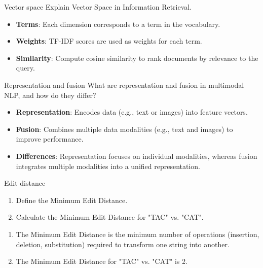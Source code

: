 \documentclass{article}
\begin{document}
\begin{exercise}{Vector space}
  Explain Vector Space in Information Retrieval.

  \begin{solution}
    \begin{itemize}
        \item \textbf{Terms}: Each dimension corresponds to a term in the vocabulary.
        \item \textbf{Weights}: TF-IDF scores are used as weights for each term.
        \item \textbf{Similarity}: Compute cosine similarity to rank documents by relevance to the query.
    \end{itemize}
  \end{solution}
\end{exercise}

\begin{exercise}{Representation and fusion}
  What are representation and fusion in multimodal NLP, and how do they differ?

  \begin{solution}
    \begin{itemize}
        \item \textbf{Representation}: Encodes data (e.g., text or images) into feature vectors.
        \item \textbf{Fusion}: Combines multiple data modalities (e.g., text and images) to improve performance.
        \item \textbf{Differences}: Representation focuses on individual modalities, whereas fusion integrates multiple modalities into a unified representation.
    \end{itemize}
  \end{solution}
\end{exercise}

\begin{exercise}{Edit distance}\label{ex:edit-distance}
  \begin{enumerate}
    \item Define the Minimum Edit Distance.
    \item Calculate the Minimum Edit Distance for "TAC" vs. "CAT".
  \end{enumerate}

  \begin{solution}
    \begin{enumerate}
        \item The Minimum Edit Distance is the minimum number of operations (insertion, deletion, substitution) required to transform one string into another.
        \item The Minimum Edit Distance for "TAC" vs. "CAT" is 2.
    \end{enumerate}
  \end{solution}
\end{exercise}
\end{document}
